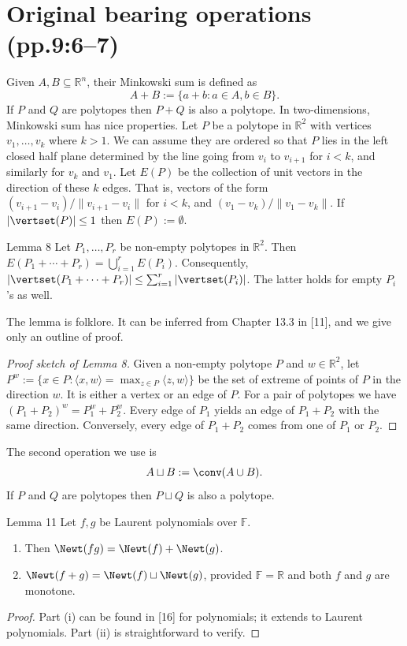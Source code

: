 \section*{Original bearing operations (pp.9:6--7)}
Given $A,B\subseteq\mathbb R^n$, their Minkowski sum is defined as
\[A+B:=\{a+b:a\in A,b\in B\}.\]
If $P$ and $Q$ are polytopes then $P+Q$ is also a polytope. In two-dimensions, Minkowski sum has nice properties. Let $P$ be a polytope in $\mathbb R^2$ with vertices $v_1,\ldots,v_k$ where $k>1$. We can assume they are ordered so that $P$ lies in the left closed half plane determined by the line going from $v_i$ to $v_{i+1}$ for $i<k$, and similarly for $v_k$ and $v_1$. Let $E(P)$ be the collection of unit vectors in the direction of these $k$ edges. That is, vectors of the form $(v_{i+1}-v_i)/\|v_{i+1}-v_i\|$ for $i<k$, and $(v_1-v_k)/\|v_1-v_k\|$. If $|\vertset(P)|\le1$ then $E(P):=\emptyset$.
\begin{sourceresult}{Lemma 8}
Let $P_1,\ldots,P_r$ be non-empty polytopes in $\mathbb R^2$. Then $E(P_1+\cdots+P_r)=\bigcup_{i=1}^r E(P_i)$. Consequently, $|\vertset(P_1+\cdots+P_r)|\le\sum_{i=1}^r|\vertset(P_i)|$. The latter holds for empty $P_i$'s as well.
\end{sourceresult}
The lemma is folklore. It can be inferred from Chapter 13.3 in [11], and we give only an outline of proof.
\begin{proof}[Proof sketch of Lemma 8]
Given a non-empty polytope $P$ and $w\in\mathbb R^2$, let $P^w:=\{x\in P:\langle x,w\rangle=\max_{z\in P}\langle z,w\rangle\}$ be the set of extreme of points of $P$ in the direction $w$. It is either a vertex or an edge of $P$. For a pair of polytopes we have $(P_1+P_2)^w=P_1^w+P_2^w$. Every edge of $P_1$ yields an edge of $P_1+P_2$ with the same direction. Conversely, every edge of $P_1+P_2$ comes from one of $P_1$ or $P_2$.
\end{proof}
The second operation we use is
\[A\sqcup B:=\conv(A\cup B).\]
If $P$ and $Q$ are polytopes then $P\sqcup Q$ is also a polytope.
\begin{sourceresult}{Lemma 11}
Let $f,g$ be Laurent polynomials over $\mathbb F$.
\begin{enumerate}
\item[(i)] Then $\Newt(fg)=\Newt(f)+\Newt(g)$.
\item[(ii)] $\Newt(f+g)=\Newt(f)\sqcup\Newt(g)$, provided $\mathbb F=\mathbb R$ and both $f$ and $g$ are monotone.
\end{enumerate}
\end{sourceresult}
\begin{proof}
Part (i) can be found in [16] for polynomials; it extends to Laurent polynomials. Part (ii) is straightforward to verify.
\end{proof}
